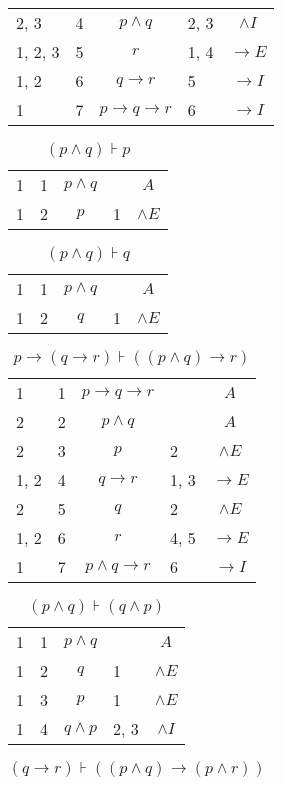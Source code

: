 \documentclass{article}
\begin{document}
\begin{table}[htbp]
\begin{tabular}{lllll}
{2, 3} & 4 & $$p∧q$$ & {2, 3} & $$∧I$$ \\
{1, 2, 3} & 5 & $$r$$ & {1, 4} & $$→E$$ \\
{1, 2} & 6 & $$q→r$$ & {5} & $$→I$$ \\
{1} & 7 & $$p→q→r$$ & {6} & $$→I$$ \\
\end{tabular}
\end{table}\begin{table}[htbp]\caption*{$(p ∧ q) ⊦ p$}\centering\begin{tabular}{lllll}
{1} & 1 & $$p∧q$$ & {} & $$A$$ \\
{1} & 2 & $$p$$ & {1} & $$∧E$$ \\
\end{tabular}
\end{table}\begin{table}[htbp]\caption*{$(p ∧ q) ⊦ q$}\centering\begin{tabular}{lllll}
{1} & 1 & $$p∧q$$ & {} & $$A$$ \\
{1} & 2 & $$q$$ & {1} & $$∧E$$ \\
\end{tabular}
\end{table}\begin{table}[htbp]\caption*{$p → (q → r) ⊦ ((p ∧ q) → r)$}\centering\begin{tabular}{lllll}
{1} & 1 & $$p→q→r$$ & {} & $$A$$ \\
{2} & 2 & $$p∧q$$ & {} & $$A$$ \\
{2} & 3 & $$p$$ & {2} & $$∧E$$ \\
{1, 2} & 4 & $$q→r$$ & {1, 3} & $$→E$$ \\
{2} & 5 & $$q$$ & {2} & $$∧E$$ \\
{1, 2} & 6 & $$r$$ & {4, 5} & $$→E$$ \\
{1} & 7 & $$p∧q→r$$ & {6} & $$→I$$ \\
\end{tabular}
\end{table}\begin{table}[htbp]\caption*{$(p ∧ q) ⊦ (q ∧ p)$}\centering\begin{tabular}{lllll}
{1} & 1 & $$p∧q$$ & {} & $$A$$ \\
{1} & 2 & $$q$$ & {1} & $$∧E$$ \\
{1} & 3 & $$p$$ & {1} & $$∧E$$ \\
{1} & 4 & $$q∧p$$ & {2, 3} & $$∧I$$ \\
\end{tabular}
\end{table}\begin{table}[htbp]\caption*{$(q → r) ⊦ ((p ∧ q) → (p ∧ r))$}\centering\begin{tabular}{lllll}

\end{tabular}
\end{table}
\end{document}
